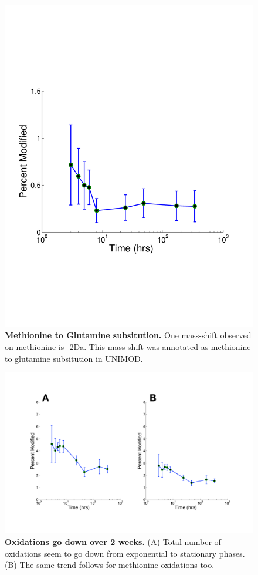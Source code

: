 \documentclass[12pt]{article}
\begin{document}
\clearpage
\begin{figure}[p]
\centerline{\includegraphics[width=5in]{Figures/MetGluTimeCourse.pdf}}
\caption{\label{fig:Phos}\textbf{Methionine to Glutamine subsitution.} One mass-shift observed on methionine is -2Da. This mass-shift was annotated as methionine to glutamine subsitution in UNIMOD.}
\end{figure}


\clearpage
\begin{figure}[p]
\centerline{\includegraphics[width=8in]{Figures/Oxidations.pdf}}
\caption{\label{fig:Oxid}\textbf{Oxidations go down over 2 weeks.} (A) Total number of oxidations seem to go down from exponential to stationary phases. (B) The same trend follows for methionine oxidations too.}
\end{figure}
\end{document}
